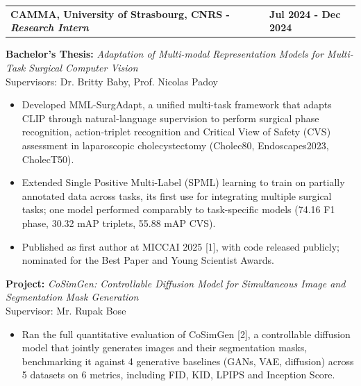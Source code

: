 \documentclass[letterpaper,11pt]{article}
\begin{document}
\vspace{0.6em}

\begin{tabularx}{\linewidth}{ @{}l X@{} }
\textbf{CAMMA, University of Strasbourg, CNRS - \textit{Research Intern}} & \hfill \textbf{Jul 2024 - Dec 2024} \\
\end{tabularx}
\vspace{-1.1em}

\textbf{Bachelor's Thesis:} \textit{Adaptation of Multi-modal Representation Models for Multi-Task Surgical Computer Vision} \\
Supervisors: Dr. Britty Baby, Prof. Nicolas Padoy
\vspace{-0.5em}
\begin{itemize}
    \item[--] Developed MML-SurgAdapt, a unified multi-task framework that adapts CLIP through natural-language supervision to perform surgical phase recognition, action-triplet recognition and Critical View of Safety (CVS) assessment in laparoscopic cholecystectomy (Cholec80, Endoscapes2023, CholecT50).\vspace{-0.5em}
    \item[--] Extended Single Positive Multi-Label (SPML) learning to train on partially annotated data across tasks, its first use for integrating multiple surgical tasks; one model performed comparably to task-specific models (74.16 F1 phase, 30.32 mAP triplets, 55.88 mAP CVS).\vspace{-0.5em}
    \item[--] Published as first author at MICCAI 2025 [1], with code released publicly; nominated for the Best Paper and Young Scientist Awards.
\end{itemize}
\vspace{0.1em}

\textbf{Project:} \textit{CoSimGen: Controllable Diffusion Model for Simultaneous Image and Segmentation Mask Generation} \\
Supervisor: Mr. Rupak Bose
\vspace{-0.5em}
\begin{itemize}
    \item[--] Ran the full quantitative evaluation of CoSimGen [2], a controllable diffusion model that jointly generates images and their segmentation masks, benchmarking it against 4 generative baselines (GANs, VAE, diffusion) across 5 datasets on 6 metrics, including FID, KID, LPIPS and Inception Score.
\end{itemize}
\end{document}
